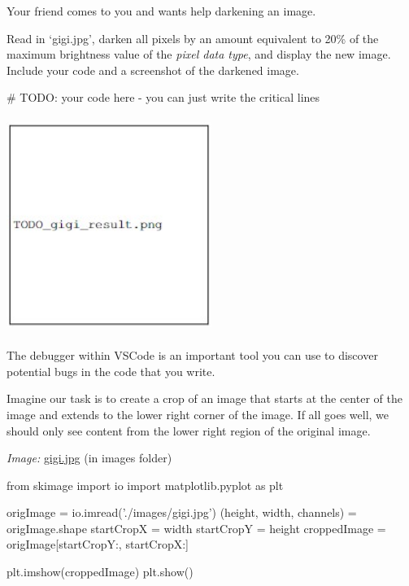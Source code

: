 \documentclass{csci1430}
\begin{document}
\begin{subquestion}[points=2]
Your friend comes to you and wants help darkening an image.

Read in `gigi.jpg', darken all pixels by an amount equivalent to 20\% of the maximum brightness value of the \emph{pixel data type}, and display the new image. Include your code and a screenshot of the darkened image.
\end{subquestion}

\begin{answer}[height=23]
\begin{python}
# TODO: your code here - you can just write the critical lines
\end{python}

\includegraphics[width=0.5\textwidth,height=7cm,keepaspectratio]{images/TODO_gigi_result.jpg}
\end{answer}

\pagebreak

\begin{question}[points=3,drawbox=false]
The debugger within VSCode is an important tool you can use to discover potential bugs in the code that you write.

Imagine our task is to create a crop of an image that starts at the center of the image and extends to the lower right corner of the image. If all goes well, we should only see content from the lower right region of the original image.

\emph{Image:} \href{images/gigi.jpg}{gigi.jpg} (in images folder)

\begin{python}
from skimage import io
import matplotlib.pyplot as plt

origImage = io.imread('./images/gigi.jpg')
(height, width, channels) = origImage.shape
startCropX = width %
startCropY = height %
croppedImage = origImage[startCropY:, startCropX:]

plt.imshow(croppedImage)
plt.show()
\end{python}
\end{question}
\end{document}

